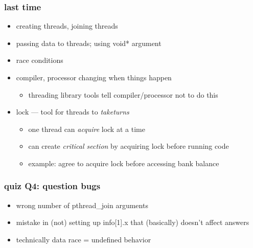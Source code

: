 \date{}
\title{}
\date{}

\begin{frame}
    \titlepage
\end{frame}



\begin{frame}
\frametitle{last time}
\begin{itemize}
\item creating threads, joining threads
\item passing data to threads; using void* argument
\item race conditions
\item compiler, processor changing when things happen
    \begin{itemize}
    \item threading library tools tell compiler/processor not to do this
    \end{itemize}
\item lock --- tool for threads to \textit{taketurns}
    \begin{itemize}
    \item one thread can \textit{acquire} lock at a time
    \item can create \textit{critical section} by acquiring lock before running code
    \item example: agree to acquire lock before accessing bank balance
    \end{itemize}
\end{itemize}
\end{frame}

\begin{frame}
\frametitle{quiz Q4: question bugs}
\begin{itemize}
    \item wrong number of pthread\_join arguments
    \item mistake in (not) setting up info[1].x that (basically) doesn't affect answers
    \item technically data race = undefined behavior
\end{itemize}
\end{frame}

